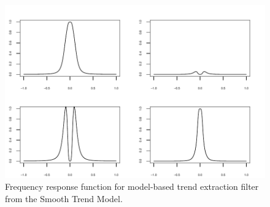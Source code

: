 \documentclass[a4paper]{book}
\begin{document}
 \begin{figure}[htb!]
\begin{center}
\includegraphics[]{stm_frf.pdf}
\caption{Frequency response function for model-based trend
 extraction filter from the Smooth Trend Model.}
\label{fig:stm-frf}
\end{center}
\end{figure} 
\end{document}

